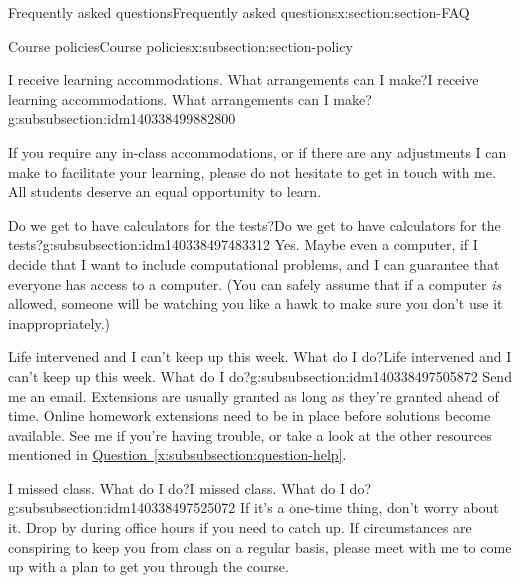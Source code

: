 \documentclass[oneside,10pt,]{article}
\begin{document}
\begin{sectionptx}{Frequently asked questions}{}{Frequently asked questions}{}{}{x:section:section-FAQ}
\begin{subsectionptx}{Course policies}{}{Course policies}{}{}{x:subsection:section-policy}
\begin{subsubsectionptx}{I receive learning accommodations. What arrangements can I make?}{}{I receive learning accommodations. What arrangements can I make?}{}{}{g:subsubsection:idm140338499882800}
\par
If you require any in-class accommodations, or if there are any adjustments I can make to facilitate your learning, please do not hesitate to get in touch with me. All students deserve an equal opportunity to learn.%
\end{subsubsectionptx}
%
%
\typeout{************************************************}
\typeout{************************************************}
%
\begin{subsubsectionptx}{Do we get to have calculators for the tests?}{}{Do we get to have calculators for the tests?}{}{}{g:subsubsection:idm140338497483312}
Yes. Maybe even a computer, if I decide that I want to include computational problems, and I can guarantee that everyone has access to a computer. (You can safely assume that if a computer \emph{is} allowed, someone will be watching you like a hawk to make sure you don't use it inappropriately.)%
\end{subsubsectionptx}
%
%
\typeout{************************************************}
\typeout{************************************************}
%
\begin{subsubsectionptx}{Life intervened and I can't keep up this week. What do I do?}{}{Life intervened and I can't keep up this week. What do I do?}{}{}{g:subsubsection:idm140338497505872}
Send me an email. Extensions are usually granted as long as they're granted ahead of time. Online homework extensions need to be in place before solutions become available. See me if you're having trouble, or take a look at the other resources mentioned in \hyperref[x:subsubsection:question-help]{Question~\ref{x:subsubsection:question-help}}.%
\end{subsubsectionptx}
%
%
\typeout{************************************************}
\typeout{************************************************}
%
\begin{subsubsectionptx}{I missed class. What do I do?}{}{I missed class. What do I do?}{}{}{g:subsubsection:idm140338497525072}
If it's a one-time thing, don't worry about it. Drop by during office hours if you need to catch up. If circumstances are conspiring to keep you from class on a regular basis, please meet with me to come up with a plan to get you through the course.%
\end{subsubsectionptx}

\end{subsectionptx}
\end{sectionptx}
\end{document}
